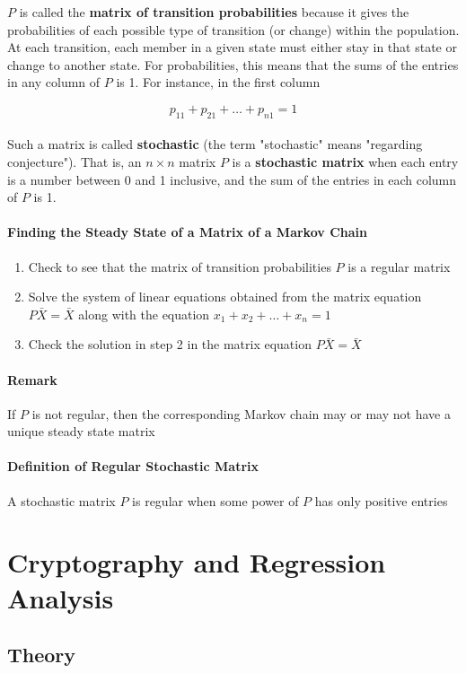 \documentclass{report}
\begin{document}
$P$ is called the \textbf{matrix of transition probabilities} because it gives the probabilities of each possible type of transition (or change) within the population. At each transition, each member in a given state must either stay in that state or change to another state. For probabilities, this means that the sums of the entries in any column of $P$ is 1. For instance, in the first column

$$
p_{11} + p_{21} + \hdots + p_{n1} = 1
$$\\

Such a matrix is called \textbf{stochastic} (the term "stochastic" means "regarding conjecture"). That is, an $n \times n$ matrix $P$ is a \textbf{stochastic matrix} when each entry is a number between 0 and 1 inclusive, and the sum of the entries in each column of $P$ is 1.

\paragraph{Finding the Steady State of a Matrix of a Markov Chain}
\begin{enumerate}
    \item Check to see that the matrix of transition probabilities $P$ is a regular matrix
    \item Solve the system of linear equations obtained from the matrix equation $P\bar{X} = \bar{X}$ along with the equation $x_1 + x_2 + \hdots + x_n = 1$
    \item Check the solution in step 2 in the matrix equation $P \bar{X} = \bar{X}$
\end{enumerate}

\paragraph{Remark} If $P$ is not regular, then the corresponding Markov chain may or may not have a unique steady state matrix

\paragraph{Definition of Regular Stochastic Matrix} A stochastic matrix $P$ is regular when some power of $P$ has only positive entries

\section{Cryptography and Regression Analysis}
\subsection{Theory}
\end{document}

